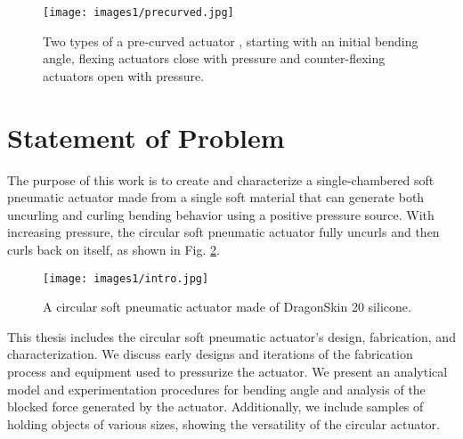 \begin{figure}[!ht]
    \centering
    \texttt{[image: images1/precurved.jpg]}
    \caption{Two types of a pre-curved actuator \cite{hu_precurved_2022}, starting with an initial bending angle, flexing actuators close with pressure and counter-flexing actuators open with pressure.}
    \label{fig:precurved}
\end{figure}

\clearpage
\section{Statement of Problem}

The purpose of this work is to create and characterize a single-chambered soft pneumatic actuator made from a single soft material that can generate both uncurling and curling bending behavior using a positive pressure source. With increasing pressure, the circular soft pneumatic actuator fully uncurls and then curls back on itself, as shown in Fig. \ref{fig:intro}. 

\begin{figure}[!ht]
    \centering
    \texttt{[image: images1/intro.jpg]}
    \caption{A circular soft pneumatic actuator made of DragonSkin 20 silicone.}
    \label{fig:intro}
\end{figure}

This thesis includes the circular soft pneumatic actuator's design, fabrication, and characterization. We discuss early designs and iterations of the fabrication process and equipment used to pressurize the actuator. We present an analytical model and experimentation procedures for bending angle and analysis of the blocked force generated by the actuator. Additionally, we include samples of holding objects of various sizes, showing the versatility of the circular actuator. 